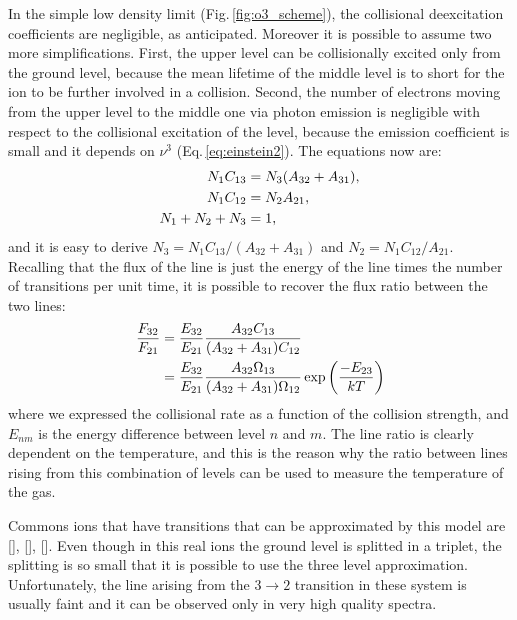 \documentclass[../main.tex]{subfiles}
\begin{document}
In the simple low density limit (Fig.\,\ref{fig:o3_scheme}), the collisional deexcitation coefficients are negligible, as anticipated.
Moreover it is possible to assume two more simplifications.
First, the upper level can be collisionally excited only from the ground level, because the mean lifetime of the middle level is to short for the ion to be further involved in a collision.
Second, the number of electrons moving from the upper level to the middle one via photon emission is negligible with respect to the collisional excitation of the level, because the emission coefficient is small and it depends on $\nu^3$ (Eq.\,\ref{eq:einstein2}).
The equations now are:
\begin{align}
    \label{eq:lowdensity_equilibrium}
    N_1 C_{13} &= N_3(A_{32}+A_{31}), \notag\\
    N_1 C_{12} &= N_2A_{21},\\
    N_1+N_2+N_3 &= 1, \notag
\end{align}
and it is easy to derive $N_3 = N_1C_{13}/(A_{32}+A_{31})$ and $N_2= N_1C_{12}/A_{21}$.
Recalling that the flux of the line is just the energy of the line times the number of transitions per unit time, it is possible to recover the flux ratio between the two lines:
\begin{align}
    \label{eq:flux_forbidden1}
    \frac{F_{32}}{F_{21}} &= \frac{E_{32}}{E_{21}}\frac{A_{32}C_{13}}{(A_{32}+A_{31})C_{12}}\\
    & = \frac{E_{32}}{E_{21}}\frac{A_{32}\Omega_{13}}{(A_{32}+A_{31})\Omega_{12}}\exp \left(\frac{-E_{23}}{kT}\right) \notag
\end{align}
where we expressed the collisional rate as a function of the collision strength, and $E_{nm}$ is the energy difference between level $n$ and $m$.
The line ratio is clearly dependent on the temperature, and this is the reason why the ratio between lines rising from this combination of levels can be used to measure the temperature of the gas.

Commons ions that have transitions that can be approximated by this model are [], [], [].
Even though in this real ions the ground level is splitted in a triplet, the splitting is so small that it is possible to use the three level approximation.
Unfortunately, the line arising from the $3\to2$ transition in these system is usually faint and it can be observed only in very high quality spectra.
\end{document}
